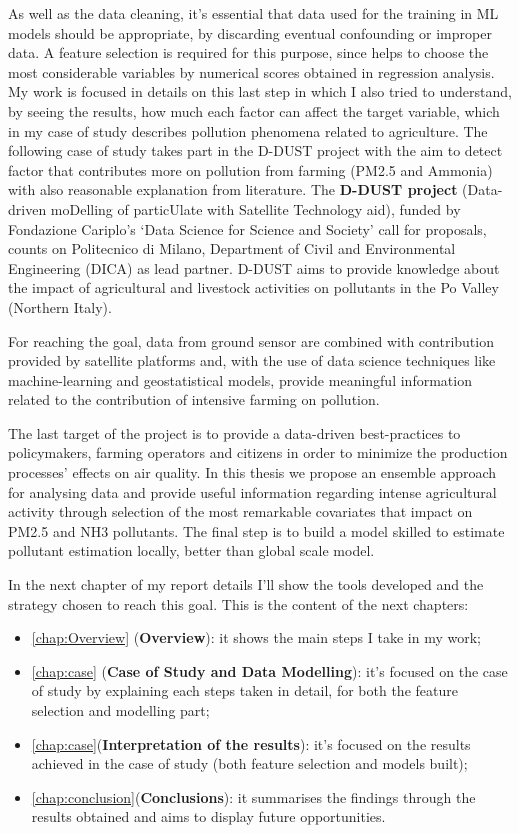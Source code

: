 As well as the data cleaning, it's essential that data used for the training in ML models should be appropriate, by discarding eventual confounding or improper data.
A feature selection is required for this purpose, since helps to choose the most considerable variables by numerical scores obtained in regression analysis.
My work is focused in details on this last step in which I also tried to understand, by seeing the results, how much each factor can affect the target variable, which in my case of study describes pollution phenomena related to agriculture.
The following case of study takes part in the D-DUST project with the aim to detect factor that contributes more on pollution from farming (PM2.5 and Ammonia) with also reasonable explanation from literature.
The \textbf{D-DUST project} (Data-driven moDelling of particUlate with Satellite Technology aid), funded by Fondazione Cariplo’s ‘Data Science for Science and Society’ call for proposals, counts on Politecnico di Milano, Department of Civil and Environmental Engineering (DICA) as lead partner.\newline
D-DUST aims to provide knowledge about the impact of agricultural and livestock activities on pollutants in the Po Valley (Northern Italy).\par 
For reaching the goal, data from ground sensor are combined with contribution provided by satellite platforms and, with the use of data science techniques like machine-learning and geostatistical models, provide meaningful information related to the contribution of intensive farming on pollution.\par
The last target of the project is to provide a data-driven best-practices to policymakers, farming operators and citizens in order to minimize the production processes' effects on air quality.
\bigskip
In this thesis we propose an ensemble approach for analysing data and provide useful information regarding intense agricultural activity through selection of the most remarkable covariates that impact on PM2.5 and NH3 pollutants. 
The final step is to build a model skilled to estimate pollutant estimation locally, better than global scale model.  

In the next chapter of my report details I'll show the tools developed and the strategy chosen to reach this goal. 
This is the content of the next chapters:

\begin{itemize}
  \item \autoref{chap:Overview} (\textbf{Overview}): it shows the main steps I take in my work;
  \item \autoref{chap:case} (\textbf{Case of Study and Data Modelling}): it's focused on the case of study by explaining each steps taken in detail, for both the feature selection and modelling part;
 \item \autoref{chap:case}(\textbf{Interpretation of the results}): it's focused on the results achieved in the case of study (both feature selection and models built);
 \item \autoref{chap:conclusion}(\textbf{Conclusions}): it summarises the findings through the results obtained and aims to display future opportunities.  
\end{itemize}

